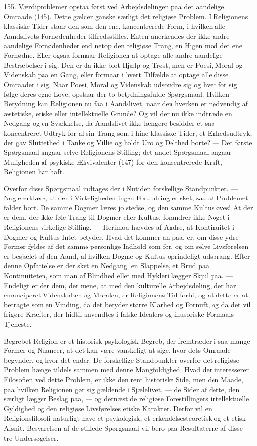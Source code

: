 \documentclass[12pt,a4paper]{book}
\newcommand{\opage}[1]{\marginnote{\footnotesize\textit{[#1]}}}
\newcommand{\apage}[1]{\marginnote{\footnotesize\textit{[#1]}}}
\begin{document}
155. Værdiproblemer opstaa først ved Arbejdsdelingen paa det aandelige Omraade (145). Dette
gælder ganske særligt det religiøse Problem. I Religionens klassiske Tider staar den som
den ene, koncentrerede Form, i hvilken alle Aandslivets Fornødenheder tilfredsstilles.
Enten anerkendes der ikke andre aandelige Fornødenheder end netop den \apage{370} religiøse Trang, en
Higen mod det ene Fornødne. Eller ogsaa formaar Religionen at optage alle andre aandelige
Bestræbelser i sig. Den er da ikke blot Hjælp og Trøst, men er Poesi, Moral og Videnskab
paa en Gang, eller formaar i hvert Tilfælde at optage alle disse Omraader i sig. Naar
Poesi, Moral og Videnskab udsondre sig og hver for sig følge deres egne Love, opstaar der to betydningsfulde Spørgsmaal. Hvilken Betydning kan Religionen nu faa i Aandslivet, naar den
hverken er nødvendig af æstetiske, etiske eller intellektuelle Grunde? Og vil der nu ikke
indtræde en Nedgang og en Svækkelse, da Aandslivet ikke længere besidder et saa
koncentreret Udtryk for al sin Trang som i hine klassiske Tider, et Enhedsudtryk, der gav
Sluttethed i Tanke og Villie og holdt Uro og Delthed borte? --- Det første Spørgsmaal
angaar selve Religionens Stilling; det andet Spørgsmaal angaar Muligheden af psykiske
Ækvivalenter (147) for den koncentrerede Kraft, Religionen har haft.

Overfor disse Spørgsmaal indtages der i Nutiden forskellige Standpunkter. --- Nogle erklære,
at der i Virkeligheden ingen Forandring er sket, saa at Problemet falder bort. De samme
Dogmer læres jo stedse, og den samme Kultus øves! At der er dem, der ikke føle Trang til
Dogmer eller Kultus, forandrer ikke Noget i Religionens virkelige Stilling. --- Herimod
hævdes af Andre, at Kontinuitet i Dogmer og Kultus Intet betyder. Hvad det kommer an paa,
er, om disse ydre Former fyldes af det samme personlige Indhold som før, og om selve
Livsførelsen er besjælet af den Aand, af hvilken Dogme og Kultus oprindeligt udsprang. Efter
denne Opfattelse er der sket en Nedgang, en Slappelse, et Brud paa Kontinuiteten, som man
af Blindhed eller med Hykleri lægger Skjul paa. --- Endeligt er der dem, der mene, at med den
kulturelle Arbejdsdeling, der har emanciperet Videnskaben og Moralen, er Religionens Tid
forbi, og at dette er at betragte som en Vinding, da det betyder større Klarhed og Fornuft,
og da det vil frigøre Kræfter, der hidtil anvendtes i falske Idealers og illusoriske
Formaals Tjeneste.

Begrebet Religion er et historisk-psykologisk Begreb, der
\opage{371} fremtræder i saa mange Former og Nuancer, at det kan være vanskeligt at sige, hvor dets
Omraade begynder, og hvor det ender. De forskellige Standpunkter overfor det religiøse
Problem hænge tildels sammen med denne Mangfoldighed. Hvad der interesserer Filosofien ved
dette Problem, er ikke den rent historiske Side, men den Maade, paa hvilken Religionen gør
sig gældende i Sjælelivet, --- de Sider af dette, den særligt lægger Beslag paa, --- og
dernæst de religiøse Forestillingers intellektuelle Gyldighed og den religiøse Livsførelses
etiske Karakter. Derfor vil en Religionsfilosofi naturligt have et psykologisk, et
erkendelsesteoretisk og et etisk Afsnit. Besvarelsen af de stillede Spørgsmaal vil bero paa
Resultaterne af disse tre Undersøgelser.
\end{document}
